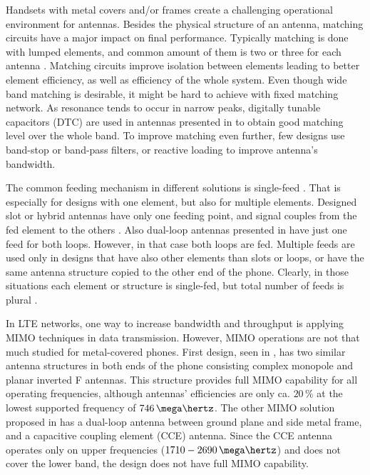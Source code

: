 Handsets with metal covers and/or frames create a challenging operational environment for antennas. Besides the physical structure of an antenna, matching circuits have a major impact on final performance. Typically matching is done with lumped elements, and common amount of them is two or three for each antenna \cite{stanley_lte_mimo, zhong_pier, wu_pier}. Matching circuits improve isolation between elements leading to better element efficiency, as well as efficiency of the whole system. Even though wide band matching is desirable, it might be hard to achieve with fixed matching network. As resonance tends to occur in narrow peaks, digitally tunable capacitors (DTC) are used in antennas presented in \cite{chen_compact_lte,wu_tunable} to obtain good matching level over the whole band. To improve matching even further, few designs use band-stop \cite{lee_monopole, wu_pier} or band-pass \cite{chen_metal_frame} filters, or reactive loading \cite{chen_compact_lte, chen_metal_frame} to improve antenna's bandwidth. %

The common feeding mechanism in different solutions is single-feed \cite{wu_tunable, chen_metal_frame, lee_monopole, chen_compact_lte}. That is especially for designs with one element, but also for multiple elements. Designed slot or hybrid antennas have only one feeding point, and signal couples from the fed element to the others \cite{son_wideband_mimo,hsu_compact,zhong_pier,yuan_slot}. Also dual-loop antennas presented in \cite{stanley_lte_mimo,ban_dual_loop} have just one feed for both loops. However, in that case both loops are fed. Multiple feeds are used only in designs that have also other elements than slots or loops, or have the same antenna structure copied to the other end of the phone. Clearly, in those situations each element or structure is single-fed, but total number of feeds is plural \cite{stanley_lte_mimo, son_wideband_mimo}.

In LTE networks, one way to increase bandwidth and throughput is applying MIMO techniques in data transmission. However, MIMO operations are not that much studied for metal-covered phones. First design, seen in \cite{son_wideband_mimo}, has two similar antenna structures in both ends of the phone consisting complex monopole and planar inverted F antennas. This structure provides full MIMO capability for all operating frequencies, although antennas' efficiencies are only ca. $20\,\%$ at the lowest supported frequency of $746\,\mega\hertz$. The other MIMO solution proposed in \cite{stanley_lte_mimo} has a dual-loop antenna between ground plane and side metal frame, and a capacitive coupling element (CCE) antenna. Since the CCE antenna operates only on upper frequencies ($1710-2690\,\mega\hertz$) and does not cover the lower band, the design does not have full MIMO capability. %


